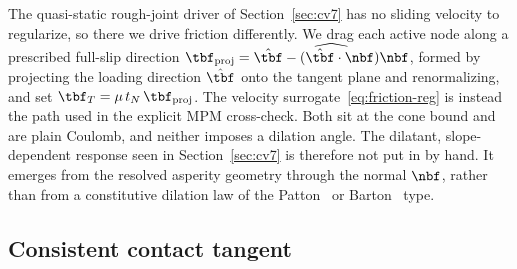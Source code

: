 The quasi-static rough-joint driver of Section~\ref{sec:cv7} has no sliding velocity to regularize, so
there we drive friction differently. We drag each active node along a prescribed full-slip direction
$\tbf_{\mathrm{proj}}=\widehat{\hat{\tbf}-(\hat{\tbf}\cdot\nbf)\nbf}$, formed by projecting the loading
direction $\hat{\tbf}$ onto the tangent plane and renormalizing, and set
$\tbf_T=\mu\,t_N\,\tbf_{\mathrm{proj}}$. The velocity surrogate~\eqref{eq:friction-reg} is instead the
path used in the explicit MPM cross-check. Both sit at the cone bound and are plain Coulomb, and
neither imposes a dilation angle. The dilatant, slope-dependent response seen in
Section~\ref{sec:cv7} is therefore not put in by hand. It emerges from the resolved asperity geometry
through the normal $\nbf$, rather than from a constitutive dilation law of the
Patton~\citep{patton1966multiple} or Barton~\citep{barton1977shear,barton1990review} type.

\subsection{Consistent contact tangent}\label{sec:form-tangent}

